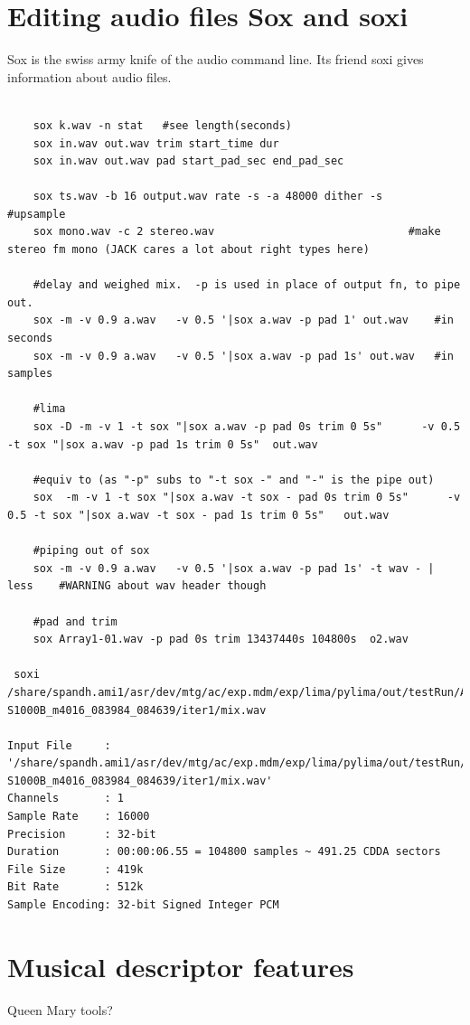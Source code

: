 \documentclass[oneside,english]{scrbook}
\begin{document}
\section{Editing audio files Sox and soxi}
Sox is the swiss army knife of the audio command line. Its friend soxi gives information about audio files.
\begin{lstlisting}

	sox k.wav -n stat   #see length(seconds)
	sox in.wav out.wav trim start_time dur			
	sox in.wav out.wav pad start_pad_sec end_pad_sec

	sox ts.wav -b 16 output.wav rate -s -a 48000 dither -s    #upsample
	sox mono.wav -c 2 stereo.wav                              #make stereo fm mono (JACK cares a lot about right types here)

	#delay and weighed mix.  -p is used in place of output fn, to pipe out.
	sox -m -v 0.9 a.wav   -v 0.5 '|sox a.wav -p pad 1' out.wav    #in seconds
	sox -m -v 0.9 a.wav   -v 0.5 '|sox a.wav -p pad 1s' out.wav   #in samples

	#lima
	sox -D -m -v 1 -t sox "|sox a.wav -p pad 0s trim 0 5s"      -v 0.5 -t sox "|sox a.wav -p pad 1s trim 0 5s"  out.wav
 
	#equiv to (as "-p" subs to "-t sox -" and "-" is the pipe out)
	sox  -m -v 1 -t sox "|sox a.wav -t sox - pad 0s trim 0 5s"      -v 0.5 -t sox "|sox a.wav -t sox - pad 1s trim 0 5s"   out.wav
	
	#piping out of sox
	sox -m -v 0.9 a.wav   -v 0.5 '|sox a.wav -p pad 1s' -t wav - | less    #WARNING about wav header though

	#pad and trim
	sox Array1-01.wav -p pad 0s trim 13437440s 104800s  o2.wav

 soxi  /share/spandh.ami1/asr/dev/mtg/ac/exp.mdm/exp/lima/pylima/out/testRun/AMI-S1000B_m4016_083984_084639/iter1/mix.wav

Input File     : '/share/spandh.ami1/asr/dev/mtg/ac/exp.mdm/exp/lima/pylima/out/testRun/AMI-S1000B_m4016_083984_084639/iter1/mix.wav'
Channels       : 1
Sample Rate    : 16000
Precision      : 32-bit
Duration       : 00:00:06.55 = 104800 samples ~ 491.25 CDDA sectors
File Size      : 419k
Bit Rate       : 512k
Sample Encoding: 32-bit Signed Integer PCM

\end{lstlisting}


\section{Musical descriptor features}
Queen Mary tools?
\end{document}
